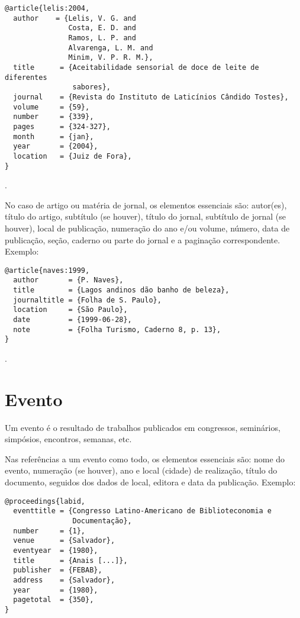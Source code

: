 \begin{Verbatim}[frame=single]
@article{lelis:2004,
  author    = {Lelis, V. G. and
               Costa, E. D. and
               Ramos, L. P. and
               Alvarenga, L. M. and
               Minim, V. P. R. M.},
  title      = {Aceitabilidade sensorial de doce de leite de diferentes
                sabores},
  journal    = {Revista do Instituto de Laticínios Cândido Tostes},
  volume     = {59},
  number     = {339},
  pages      = {324-327},
  month      = {jan},
  year       = {2004},
  location   = {Juiz de Fora},
}
\end{Verbatim}

\noindent
{}.

\vspace*{1em}

No caso de artigo ou matéria de jornal, os elementos essenciais são: autor(es), título do artigo, subtítulo (se houver), título do jornal, subtítulo de jornal (se houver), local de publicação, numeração do ano e/ou volume, número, data de publicação, seção, caderno ou parte do jornal e a paginação correspondente.
Exemplo:

\vspace*{1em}

\begin{Verbatim}[frame=single]
@article{naves:1999,
  author       = {P. Naves},
  title        = {Lagos andinos dão banho de beleza},
  journaltitle = {Folha de S. Paulo},
  location     = {São Paulo},
  date         = {1999-06-28},
  note         = {Folha Turismo, Caderno 8, p. 13},
}
\end{Verbatim}

\noindent
{}.

\section{Evento}

Um evento é o resultado de trabalhos publicados em congressos, seminários, simpósios, encontros, semanas, etc.

Nas referências a um evento como todo, os elementos essenciais são: nome do evento, numeração (se houver), ano e local (cidade) de realização, título do documento, seguidos dos dados de local, editora e data da publicação.
Exemplo:

\vspace*{1em}


\begin{Verbatim}[frame=single]
@proceedings{labid,
  eventtitle = {Congresso Latino-Americano de Biblioteconomia e
                Documentação},
  number     = {1},
  venue      = {Salvador},
  eventyear  = {1980},
  title      = {Anais [...]},
  publisher  = {FEBAB},
  address    = {Salvador},
  year       = {1980},
  pagetotal  = {350},
}
\end{Verbatim}

